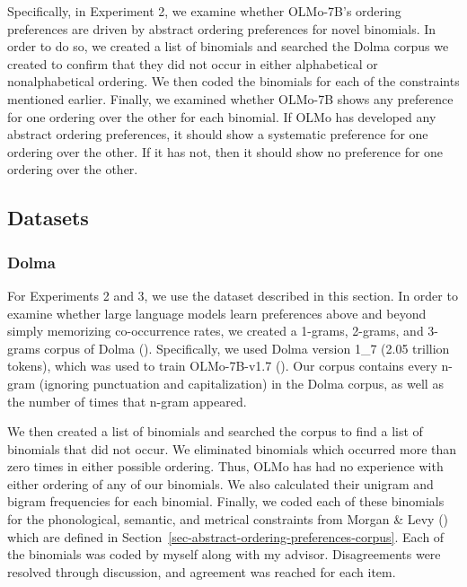 \documentclass[
  12pt,
  letterpaper,
]{scrreport}
\begin{document}
Specifically, in Experiment 2, we examine whether OLMo-7B's ordering
preferences are driven by abstract ordering preferences for novel
binomials. In order to do so, we created a list of binomials and
searched the Dolma corpus we created to confirm that they did not occur
in either alphabetical or nonalphabetical ordering. We then coded the
binomials for each of the constraints mentioned earlier. Finally, we
examined whether OLMo-7B shows any preference for one ordering over the
other for each binomial. If OLMo has developed any abstract ordering
preferences, it should show a systematic preference for one ordering
over the other. If it has not, then it should show no preference for one
ordering over the other.

\subsection{Datasets}\label{datasets}

\subsubsection{Dolma}\label{dolma}

For Experiments 2 and 3, we use the dataset described in this section.
In order to examine whether large language models learn preferences
above and beyond simply memorizing co-occurrence rates, we created a
1-grams, 2-grams, and 3-grams corpus of Dolma
().
Specifically, we used Dolma version 1\_7 (2.05 trillion tokens), which
was used to train OLMo-7B-v1.7
(). Our corpus contains every n-gram (ignoring punctuation and
capitalization) in the Dolma corpus, as well as the number of times that
n-gram appeared.

We then created a list of binomials and searched the corpus to find a
list of binomials that did not occur. We eliminated binomials which
occurred more than zero times in either possible ordering. Thus, OLMo
has had no experience with either ordering of any of our binomials. We
also calculated their unigram and bigram frequencies for each binomial.
Finally, we coded each of these binomials for the phonological,
semantic, and metrical constraints from Morgan \& Levy
() which are defined in
Section~\ref{sec-abstract-ordering-preferences-corpus}. Each of the
binomials was coded by myself along with my advisor. Disagreements were
resolved through discussion, and agreement was reached for each item.
\end{document}
